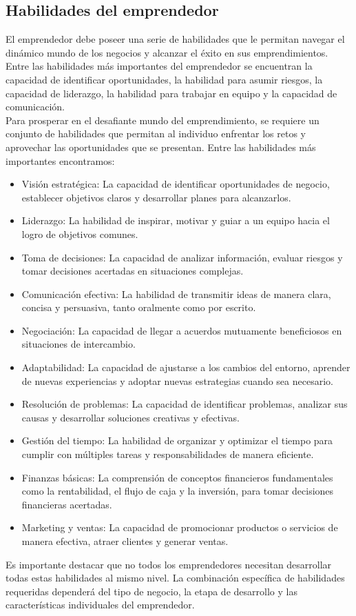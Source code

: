 \documentclass{article}
\begin{document}
\subsection{Habilidades del emprendedor}
El emprendedor debe poseer una serie de habilidades que le permitan navegar el dinámico mundo de los negocios y alcanzar el éxito en sus emprendimientos. Entre las habilidades más importantes del emprendedor se encuentran la capacidad de identificar oportunidades, la habilidad para asumir riesgos, la capacidad de liderazgo, la habilidad para trabajar en equipo y la capacidad de comunicación.
\vspace{0.5cm}\\
Para prosperar en el desafiante mundo del emprendimiento, se requiere un conjunto de habilidades que permitan al individuo enfrentar los retos y aprovechar las oportunidades que se presentan. Entre las habilidades más importantes encontramos:
\begin{itemize}
\item
    Visión estratégica: La capacidad de identificar oportunidades de negocio, establecer objetivos claros y desarrollar planes para alcanzarlos.
\item
    Liderazgo: La habilidad de inspirar, motivar y guiar a un equipo hacia el logro de objetivos comunes.
\item
    Toma de decisiones: La capacidad de analizar información, evaluar riesgos y tomar decisiones acertadas en situaciones complejas.
\item
    Comunicación efectiva: La habilidad de transmitir ideas de manera clara, concisa y persuasiva, tanto oralmente como por escrito.
\item
    Negociación: La capacidad de llegar a acuerdos mutuamente beneficiosos en situaciones de intercambio.
\item
    Adaptabilidad: La capacidad de ajustarse a los cambios del entorno, aprender de nuevas experiencias y adoptar nuevas estrategias cuando sea necesario.
\item
    Resolución de problemas: La capacidad de identificar problemas, analizar sus causas y desarrollar soluciones creativas y efectivas.
\item
    Gestión del tiempo: La habilidad de organizar y optimizar el tiempo para cumplir con múltiples tareas y responsabilidades de manera eficiente.
\item
    Finanzas básicas: La comprensión de conceptos financieros fundamentales como la rentabilidad, el flujo de caja y la inversión, para tomar decisiones financieras acertadas.
\item
    Marketing y ventas: La capacidad de promocionar productos o servicios de manera efectiva, atraer clientes y generar ventas.
\end{itemize}
Es importante destacar que no todos los emprendedores necesitan desarrollar todas estas habilidades al mismo nivel. La combinación específica de habilidades requeridas dependerá del tipo de negocio, la etapa de desarrollo y las características individuales del emprendedor.
\end{document}
